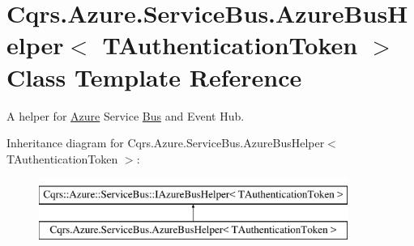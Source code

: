 \hypertarget{classCqrs_1_1Azure_1_1ServiceBus_1_1AzureBusHelper}{}\section{Cqrs.\+Azure.\+Service\+Bus.\+Azure\+Bus\+Helper$<$ T\+Authentication\+Token $>$ Class Template Reference}
\label{classCqrs_1_1Azure_1_1ServiceBus_1_1AzureBusHelper}


A helper for \hyperlink{namespaceCqrs_1_1Azure}{Azure} Service \hyperlink{namespaceCqrs_1_1Bus}{Bus} and Event Hub.  


Inheritance diagram for Cqrs.\+Azure.\+Service\+Bus.\+Azure\+Bus\+Helper$<$ T\+Authentication\+Token $>$\+:\begin{figure}[H]
\begin{center}
\leavevmode
\includegraphics[height=2.000000cm]{classCqrs_1_1Azure_1_1ServiceBus_1_1AzureBusHelper}
\end{center}
\end{figure}
